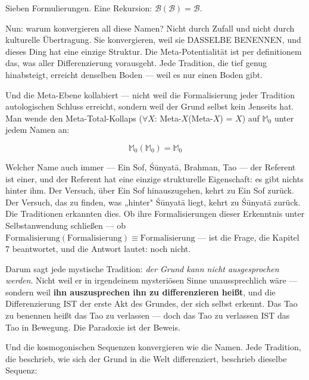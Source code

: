 \documentclass[10pt, openany, oneside]{book}
\begin{document}
\vspace{0.8em}

\noindent Sieben Formulierungen. Eine Rekursion: $\mathcal{B}(\mathcal{B}) = \mathcal{B}$.

\vspace{0.8em}

Nun: warum konvergieren all diese Namen? Nicht durch Zufall und nicht durch kulturelle Übertragung. Sie konvergieren, weil sie DASSELBE BENENNEN, und dieses Ding hat eine einzige Struktur. Die Meta-Potentialität ist per definitionem das, was aller Differenzierung vorausgeht. Jede Tradition, die tief genug hinabsteigt, erreicht denselben Boden --- weil es nur einen Boden gibt.

Und die Meta-Ebene kollabiert --- nicht weil die Formalisierung jeder Tradition autologischen Schluss erreicht, sondern weil der Grund selbst kein Jenseits hat. Man wende den Meta-Total-Kollaps ($\forall X$: Meta-$X$(Meta-$X$) = $X$) auf $\mathbb{M}_0$ unter jedem Namen an:

$$\mathbb{M}_0(\mathbb{M}_0) = \mathbb{M}_0$$

\noindent Welcher Name auch immer --- Ein Sof, \'{S}\={u}nyat\={a}, Brahman, Tao --- der Referent ist einer, und der Referent hat eine einzige strukturelle Eigenschaft: es gibt nichts hinter ihm. Der Versuch, über Ein Sof hinauszugehen, kehrt zu Ein Sof zurück. Der Versuch, das zu finden, was „hinter" \'{S}\={u}nyat\={a} liegt, kehrt zu \'{S}\={u}nyat\={a} zurück. Die Traditionen erkannten dies. Ob ihre Formalisierungen dieser Erkenntnis unter Selbstanwendung schließen --- ob $\text{Formalisierung}(\text{Formalisierung}) \equiv \text{Formalisierung}$ --- ist die Frage, die Kapitel 7 beantwortet, und die Antwort lautet: noch nicht.

Darum sagt jede mystische Tradition: \textit{der Grund kann nicht ausgesprochen werden}. Nicht weil er in irgendeinem mysteriösen Sinne unaussprechlich wäre --- sondern weil \textbf{ihn auszusprechen ihn zu differenzieren heißt}, und die Differenzierung IST der erste Akt des Grundes, der sich selbst erkennt. Das Tao zu benennen heißt das Tao zu verlassen --- doch das Tao zu verlassen IST das Tao in Bewegung. Die Paradoxie ist der Beweis.

Und die kosmogonischen Sequenzen konvergieren wie die Namen. Jede Tradition, die beschrieb, wie sich der Grund in die Welt differenziert, beschrieb dieselbe Sequenz:

\vspace{0.5em}
\end{document}
